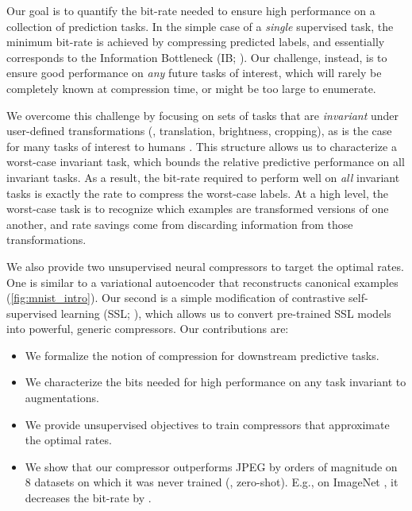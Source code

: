 \documentclass[final]{article}
\begin{document}
Our goal is to quantify the bit-rate needed to ensure high performance on a collection of prediction tasks.
In the simple case of a \emph{single} supervised task, the minimum bit-rate is achieved by compressing predicted labels, and essentially corresponds to the Information Bottleneck (IB; \cite{tishby_information_2000}).
Our challenge, instead, is to ensure good performance on \emph{any} future tasks of interest, which will rarely be completely known at compression time, or might be too large to enumerate.


We overcome this challenge by focusing on sets of tasks that are \textit{invariant} under user-defined transformations (\eg, translation, brightness, cropping), as is the case for many tasks of interest to humans \cite{heaton_ian_2018,shorten_survey_2019}.
This structure allows us to characterize a worst-case invariant task, which bounds the relative predictive performance on all invariant tasks.
As a result, the bit-rate required to perform well on \textit{all} invariant tasks is exactly the rate to compress the worst-case labels.
At a high level, the worst-case task is to recognize which examples are transformed versions of one another, and rate savings come from discarding information from those transformations. 

We also provide two unsupervised neural compressors to target the optimal rates.
One is similar to a variational autoencoder \cite{kingma_auto-encoding_2014} that reconstructs canonical examples (\cref{fig:mnist_intro}).
Our second is a simple modification of contrastive self-supervised learning (SSL; \cite{oord_representation_2019}), which allows us to convert pre-trained SSL models into powerful, generic compressors.
Our contributions are:
\begin{itemize}[noitemsep,leftmargin=*]
\item We formalize the notion of compression for downstream predictive tasks.
\item We characterize the bits needed for high performance on any task invariant to augmentations.
\item We provide unsupervised objectives to train compressors that approximate the optimal rates.
\item We show that our compressor outperforms JPEG by orders of magnitude on 8 datasets on which it was never trained (\ie, zero-shot).
E.g., on ImageNet \cite{deng_imagenet_2009}, it decreases the bit-rate by .
\end{itemize}

 
\end{document}
